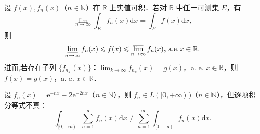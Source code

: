 \documentclass[../../main.tex]{subfiles}%
\begin{document}
\begin{example}
设 \( f(x), f_n(x) \)（\( n \in \mathbb{N} \)）在 \( \mathbb{R} \) 上实值可积．若对 \( \mathbb{R} \) 中任一可测集 \( E \)，有
\[
\lim_{n \to \infty} \int_E f_n(x) \mathrm{d}x = \int_E f(x) \mathrm{d}x,
\]
则
\begin{align*}
\varliminf_{n \to \infty} f_n(x) \leqslant f(x) \leqslant \varlimsup_{n \to \infty} f_n(x) ,\,\text{a.e.}\,x \in \mathbb{R}.
\end{align*}
进而,若存在子列 \( \{ f_{n_k}(x) \} \)：\( \lim_{k \to \infty} f_{n_k}(x) = g(x) \)，a. e. \( x \in \mathbb{R} \)，则 \( f(x) = g(x) \)，a. e. \( x \in \mathbb{R} \)．
\end{example}
\begin{remark}
设 \( f_n(x) = \mathrm{e}^{-nx} - 2\mathrm{e}^{-2nx} \)（\( n \in \mathbb{N} \)），则 \( f_n \in L([0, +\infty)) \)（\( n \in \mathbb{N} \)），但逐项积分等式不真：
\[
\int_{[0, +\infty)} \sum_{n=1}^{\infty} f_n(x) \mathrm{d}x \neq \sum_{n=1}^{\infty} \int_{[0, +\infty)} f_n(x) \mathrm{d}x.
\]
\end{remark}
\end{document}
